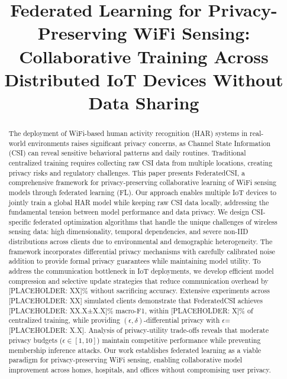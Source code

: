 \documentclass[journal]{IEEEtran}
\begin{document}
\title{Federated Learning for Privacy-Preserving WiFi Sensing: Collaborative Training Across Distributed IoT Devices Without Data Sharing}

\author{
}

\maketitle

\begin{abstract}
The deployment of WiFi-based human activity recognition (HAR) systems in real-world environments raises significant privacy concerns, as Channel State Information (CSI) can reveal sensitive behavioral patterns and daily routines. Traditional centralized training requires collecting raw CSI data from multiple locations, creating privacy risks and regulatory challenges. This paper presents FederatedCSI, a comprehensive framework for privacy-preserving collaborative learning of WiFi sensing models through federated learning (FL). Our approach enables multiple IoT devices to jointly train a global HAR model while keeping raw CSI data locally, addressing the fundamental tension between model performance and data privacy. We design CSI-specific federated optimization algorithms that handle the unique challenges of wireless sensing data: high dimensionality, temporal dependencies, and severe non-IID distributions across clients due to environmental and demographic heterogeneity. The framework incorporates differential privacy mechanisms with carefully calibrated noise addition to provide formal privacy guarantees while maintaining model utility. To address the communication bottleneck in IoT deployments, we develop efficient model compression and selective update strategies that reduce communication overhead by [PLACEHOLDER: XX]\% without sacrificing accuracy. Extensive experiments across [PLACEHOLDER: XX] simulated clients demonstrate that FederatedCSI achieves [PLACEHOLDER: XX.X±X.X]\% macro-F1, within [PLACEHOLDER: X]\% of centralized training, while providing $(\epsilon, \delta)$-differential privacy with $\epsilon$=[PLACEHOLDER: X.X]. Analysis of privacy-utility trade-offs reveals that moderate privacy budgets ($\epsilon \in [1, 10]$) maintain competitive performance while preventing membership inference attacks. Our work establishes federated learning as a viable paradigm for privacy-preserving WiFi sensing, enabling collaborative model improvement across homes, hospitals, and offices without compromising user privacy.
\end{abstract}
\end{document}
